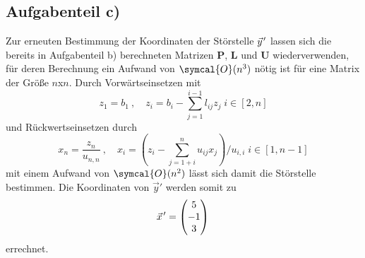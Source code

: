 \subsection*{Aufgabenteil c)}
Zur erneuten Bestimmung der Koordinaten der Störstelle $\pvec{y}'$ lassen sich die bereits
in Aufgabenteil b) berechneten Matrizen $\symbf{P}$, $\symbf{L}$ und $\symbf{U}$ wiederverwenden, für deren Berechnung ein Aufwand von $\symcal{O}(n^3)$ nötig ist für eine Matrix der Größe $n$x$n$.
Durch Vorwärtseinsetzen mit
\begin{equation}
  z_1=b_1 \: , \quad z_i=b_i-\sum_{j=1}^{i-1}l_{ij}z_j\; i \in [2,n]
\end{equation}
und Rückwertseinsetzen durch
\begin{equation}
  x_n=\frac{z_n}{u_{n,n}} \: , \quad x_i=(z_i-\sum_{j=1+i}^{n}u_{ij}x_j)/u_{i,i}\; i \in [1,n-1]
\end{equation}
mit einem Aufwand von $\symcal{O}(n^2)$ %
lässt sich damit die Störstelle bestimmen.
Die Koordinaten von $\vec{y}'$ werden somit zu
\begin{equation*}
  \pvec{x}'=
  \begin{pmatrix}
    5 \\
    -1 \\
    3 \\
  \end{pmatrix} \\
\end{equation*}
errechnet.


